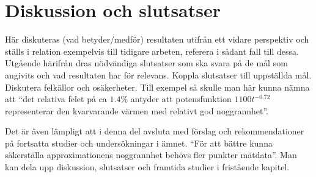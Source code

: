 \documentclass[a4paper]{article}
\begin{document}
\newpage
\section{Diskussion och slutsatser}


Här diskuteras (vad betyder/medför) resultaten utifrån ett vidare perspektiv och ställs i relation exempelvis till tidigare arbeten, referera i sådant fall till dessa. Utgående härifrån dras nödvändiga slutsatser som ska svara på de mål som angivits och vad resultaten har för relevans. Koppla slutsatser till uppställda mål. Diskutera felkällor och osäkerheter. Till exempel så skulle man här kunna nämna att ``det relativa felet på ca $1.4$\% antyder att potensfunktion $1100t^{-0.72}$ representerar den kvarvarande värmen med relativt god noggrannhet''.

Det är även lämpligt att i denna del avsluta med förslag och rekommendationer på fortsatta studier och undersökningar i ämnet. ``För att bättre kunna säkerställa approximationens noggrannhet behövs fler punkter mätdata''. Man kan dela upp diskussion, slutsatser och framtida studier i fristående kapitel.

\newpage
\printbibliography %

%
% 
\end{document}
